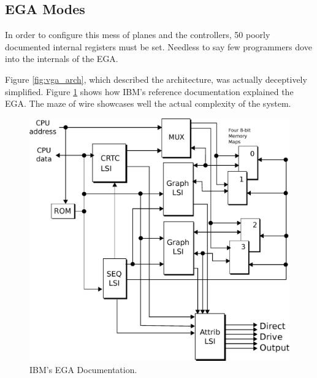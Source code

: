 \documentclass[book.tex]{subfiles}
\begin{document}
\subsection{EGA Modes}
In order to configure this mess of planes and the controllers, 50 poorly documented internal registers must be set. Needless to say few programmers dove into the internals of the EGA.\\
\par
  Figure \ref{fig:vga_arch}, which described the architecture, was actually deceptively simplified. Figure \ref{fig:ibm_ega} shows how IBM's reference documentation explained the EGA. The maze of wire showcases well the actual complexity of the system.\\
 \par
 \vspace{10pt}
 \begin{figure}[H]
\centering
\includegraphics[width=\textwidth]{imgs/drawings/ibm_ega.eps}
\caption{IBM's EGA Documentation.}
\label{fig:ibm_ega}
\end{figure}
\end{document}
